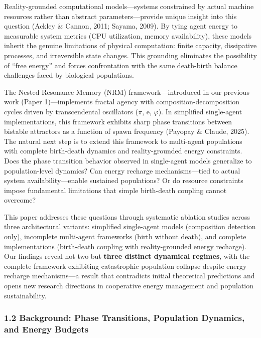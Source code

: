 \documentclass[
]{article}
\begin{document}
Reality-grounded computational models---systems constrained by actual
machine resources rather than abstract parameters---provide unique
insight into this question (Ackley \& Cannon, 2011; Sayama, 2009). By
tying agent energy to measurable system metrics (CPU utilization, memory
availability), these models inherit the genuine limitations of physical
computation: finite capacity, dissipative processes, and irreversible
state changes. This grounding eliminates the possibility of ``free
energy'' and forces confrontation with the same death-birth balance
challenges faced by biological populations.

The Nested Resonance Memory (NRM) framework---introduced in our previous
work (Paper 1)---implements fractal agency with
composition-decomposition cycles driven by transcendental oscillators
($\pi$, e, $\varphi$). In simplified single-agent implementations, this framework
exhibits sharp phase transitions between bistable attractors as a
function of spawn frequency (Payopay \& Claude, 2025). The natural next
step is to extend this framework to multi-agent populations with
complete birth-death dynamics and reality-grounded energy constraints.
Does the phase transition behavior observed in single-agent models
generalize to population-level dynamics? Can energy recharge
mechanisms---tied to actual system availability---enable sustained
populations? Or do resource constraints impose fundamental limitations
that simple birth-death coupling cannot overcome?

This paper addresses these questions through systematic ablation studies
across three architectural variants: simplified single-agent models
(composition detection only), incomplete multi-agent frameworks (birth
without death), and complete implementations (birth-death coupling with
reality-grounded energy recharge). Our findings reveal not two but
\textbf{three distinct dynamical regimes}, with the complete framework
exhibiting catastrophic population collapse despite energy recharge
mechanisms---a result that contradicts initial theoretical predictions
and opens new research directions in cooperative energy management and
population sustainability.

\subsubsection{1.2 Background: Phase Transitions, Population Dynamics,
and Energy
Budgets}\label{background-phase-transitions-population-dynamics-and-energy-budgets}
\end{document}
